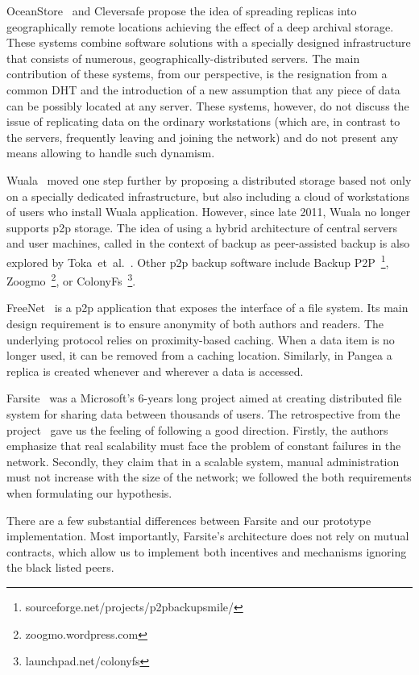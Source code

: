 \documentclass[10pt, final, conference, letterpaper]{IEEEtran}
\begin{document}
OceanStore~\cite{oceanStore} and Cleversafe
propose the idea of spreading replicas into geographically remote locations achieving the effect of a deep archival storage. These systems combine software solutions with a specially designed infrastructure that consists of numerous, geographically-distributed servers. The main contribution of these systems, from our perspective, is the resignation from a common DHT and the introduction of a new assumption that any piece of data can be possibly located at any server. These systems, however, do not discuss the issue of replicating data on the ordinary workstations (which are, in contrast to the servers, frequently leaving and joining the network) and do not present any means allowing to handle such dynamism.

Wuala~\cite{wualaStudy}
moved one step further by proposing a distributed storage based not only on a specially dedicated infrastructure, but also including a cloud of workstations of users who install Wuala application. However, since late 2011, Wuala no longer supports p2p storage. The idea of using a hybrid architecture of central servers and user machines, called in the context of backup as peer-assisted backup is also explored by Toka~et~al.~\cite{peerAssistedApproach}.
Other p2p backup software include Backup P2P~\footnote{sourceforge.net/projects/p2pbackupsmile/}, Zoogmo~\footnote{zoogmo.wordpress.com}, or ColonyFs~\footnote{launchpad.net/colonyfs}.


FreeNet~\cite{freenet}
is a p2p application that exposes the interface of a file system. Its main design requirement is to ensure anonymity of both authors and readers. The underlying protocol relies on proximity-based caching. When a data item is no longer used, it can be removed from a caching location. Similarly, in Pangea \cite{pangea}  a replica  is created whenever and wherever a data is accessed.

Farsite~\cite{farsiteRetrospection} was a Microsoft's 6-years long project aimed at creating distributed file system for sharing data between thousands of users. The retrospective from the project~\cite{farsiteRetrospection} gave us the feeling of following a good direction. Firstly, the authors emphasize that real scalability must face the problem of constant failures in the network. Secondly, they claim that in a scalable system, manual administration must not increase with the size of the network; we followed the both requirements when formulating our hypothesis.

There are a few substantial differences between Farsite and our prototype implementation. Most importantly, Farsite's architecture does not rely on mutual contracts, which allow us to implement both incentives and mechanisms ignoring the black listed peers.
\end{document}
